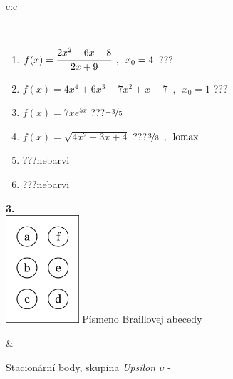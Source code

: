 \documentclass[10pt]{report}
\begin{document}
\begin{tabular}{c:c}
\begin{minipage}[c][104.5mm][t]{0.5\linewidth}
\begin{center}
\begin{minipage}{0.95\linewidth}
\begin{center}
\end{center}
\end{minipage}
\\[1mm]
\begin{minipage}{0.79\linewidth}
\begin{center}
\begin{varwidth}{\linewidth}
\begin{enumerate}
\normalsize
\item $f(x)=\cfrac{2x^2+6x-8}{2x+9}\enspace , \enspace x_0=4$\quad \dotfill\; ???\;\dotfill \quad {}
\item $f(x)=4x^4+6x^3-7x^2+x-7\enspace , \enspace x_0=1$\quad \dotfill\; ???\;\dotfill \quad {}
\item $f(x)=7xe^{5x}$\quad \dotfill\; ???\;\dotfill \quad $\nicefrac{-3}{5}$
\item $f(x)=\sqrt{4x^2-3x+4}$\quad \dotfill\; ???\;\dotfill \quad $\nicefrac{3}{8}\enspace , \enspace\mathrm{lomax}$
\item \quad \dotfill\; ???\;\dotfill \quad nebarvi
\item \quad \dotfill\; ???\;\dotfill \quad nebarvi
\end{enumerate}
\end{varwidth}
\end{center}
\end{minipage}
\begin{minipage}{0.20\linewidth}
\begin{center}
{\Huge\bfseries 3.} \\[2mm]
\includegraphics[height=40mm]{../images/braille.png}
{\small Písmeno Braillovej abecedy}
\end{center}
\end{minipage}
\end{center}
\end{minipage}
&
\begin{minipage}[c][104.5mm][t]{0.5\linewidth}
\begin{center}
\vspace{7mm}
{\huge Stacionární body, skupina \textit{Upsilon $\upsilon$} -}\\[5mm]

\end{center}
\end{minipage}
\end{tabular}
\end{document}
